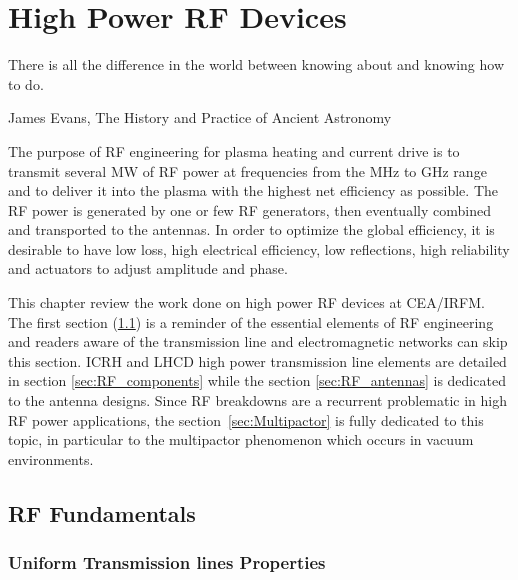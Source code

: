 \chapter{High Power RF Devices}
\label{chap:rf_power_devices}

\margintoc

\epigraph{There is all the difference in the world between knowing about and knowing how to do.}{James Evans, The History and Practice of Ancient Astronomy}


The purpose of RF engineering for plasma heating and current drive is to transmit several MW of RF power at frequencies from the MHz to GHz range and to deliver it into the plasma with the highest net efficiency as possible. The RF power is generated by one or few RF generators, then eventually combined and transported to the antennas. In order to optimize the global efficiency, it is desirable to have low loss, high electrical efficiency, low reflections, high reliability and actuators to adjust amplitude and phase. 

This chapter review the work done on high power RF devices at CEA/IRFM. The first section (\ref{sec:RF_fundamentals}) is a reminder of the essential elements of RF engineering and readers aware of the transmission line and electromagnetic networks can skip this section. 
ICRH and LHCD high power transmission line elements are detailed in section \ref{sec:RF_components} while the section \ref{sec:RF_antennas} is dedicated to the antenna designs. Since RF breakdowns are a recurrent problematic in high RF power applications, the section~\ref{sec:Multipactor} is fully dedicated to this topic, in particular to the multipactor phenomenon which occurs in vacuum environments.



\section{RF Fundamentals}\label{sec:RF_fundamentals}

\subsection{Uniform Transmission lines Properties}

